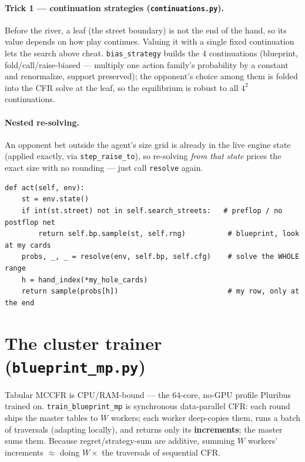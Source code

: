 \documentclass[11pt,a4paper]{article}
\newcommand{\file}[1]{\textcolor{accent}{\texttt{#1}}}
\newcommand{\fn}[1]{\texttt{#1}}
\begin{document}
\paragraph{Trick 1 --- continuation strategies (\file{continuations.py}).} Before
the river, a leaf (the street boundary) is not the end of the hand, so its value
depends on how play continues. Valuing it with a single fixed continuation lets
the search above cheat. \fn{bias\_strategy} builds the 4 continuations
(blueprint, fold/call/raise-biased --- multiply one action family's probability by
a constant and renormalize, support preserved); the opponent's choice among them
is folded into the CFR solve at the leaf, so the equilibrium is robust to all
$4^{2}$ continuations.

\paragraph{Nested re-solving.} An opponent bet outside the agent's size grid is
already in the live engine state (applied exactly, via \texttt{step\_raise\_to}),
so re-solving \emph{from that state} prices the exact size with no rounding ---
just call \fn{resolve} again.

\begin{lstlisting}[style=py, caption={\file{play.py} --- the agent. Preflop (dense abstraction) plays the blueprint directly; on the river it re-solves the whole range and reads its row. Postflop search needs a postflop-trained blueprint to value continuation leaves.}]
def act(self, env):
    st = env.state()
    if int(st.street) not in self.search_streets:   # preflop / no postflop net
        return self.bp.sample(st, self.rng)          # blueprint, look at my cards
    probs, _, _ = resolve(env, self.bp, self.cfg)    # solve the WHOLE range
    h = hand_index(*my_hole_cards)
    return sample(probs[h])                          # my row, only at the end
\end{lstlisting}

\section{The cluster trainer (\file{blueprint\_mp.py})}

Tabular MCCFR is CPU/RAM-bound --- the 64-core, no-GPU profile Pluribus trained
on. \fn{train\_blueprint\_mp} is synchronous data-parallel CFR: each round ships
the master tables to $W$ workers; each worker deep-copies them, runs a batch of
traversals (adapting locally), and returns only its \textbf{increments}; the
master sums them. Because regret/strategy-sum are additive, summing $W$ workers'
increments $\approx$ doing $W\times$ the traversals of sequential CFR.
\end{document}
